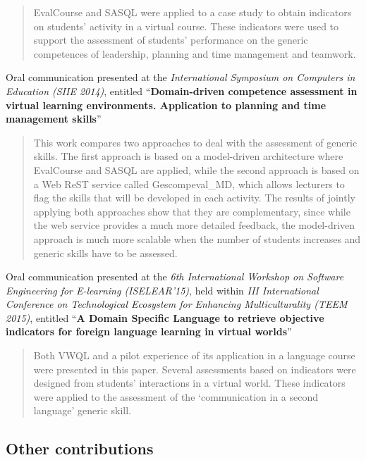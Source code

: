 \begin{quote}EvalCourse and SASQL were applied to a case study to obtain indicators on students’ activity in a virtual course. These indicators were used to support the assessment of students’ performance on the generic competences of leadership, planning and time management and teamwork.\end{quote}

\noindent
Oral communication presented at the \emph{International Symposium on Computers in Education (SIIE 2014)}, entitled ``\textbf{Domain-driven competence assessment in virtual learning environments. Application to planning and time management skills}''~\cite{balderas2014domain}

\begin{quote}This work compares two approaches to deal with the assessment of generic skills. The first approach is based on a model-driven architecture where EvalCourse and SASQL are applied, while the second approach is based on a Web ReST service called Gescompeval\_MD, which allows lecturers to flag the skills that will be developed in each activity. The results of jointly applying both approaches show that they are complementary, since while the web service provides a much more detailed feedback, the model-driven approach is much more scalable when the number of students increases and generic skills have to be assessed.\end{quote}

\noindent
Oral communication presented at the \emph{6th International Workshop on Software Engineering for E-learning (ISELEAR’15)}, held within \emph{III International Conference on Technological Ecosystem for Enhancing Multiculturality (TEEM 2015)}, entitled ``\textbf{A Domain Specific Language to retrieve objective indicators for foreign language learning in virtual worlds}''~\cite{balderas2015domain}

\begin{quote}Both VWQL and a pilot experience of its application in a language course were presented in this paper. Several assessments based on indicators were designed from students’ interactions in a virtual world. These indicators were applied to the assessment of the ‘communication in a second language’ generic skill.\end{quote}

	\subsection*{Other contributions}

